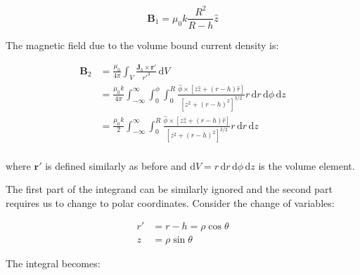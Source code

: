 \documentclass[12pt]{article}
\begin{document}
\begin{equation}
    \mathbf{B}_{1} = \mu_{0}k \frac{R^{2}}{R-h} \hat{z}
\end{equation}

The magnetic field due to the volume bound current density is:

\begin{equation}
    \begin{split}
        \mathbf{B}_{2} &= \frac{\mu_{0}}{4\pi} \int_{V} \frac{\mathbf{J}_{b} \times \mathbf{r}'}{r'^{3}} \, \mathrm{d}V \\
        &= \frac{\mu_{0}k}{4\pi} \int_{-\infty}^{\infty} \int_{0}^{\phi} \int_{0}^{R} \frac{\hat{\phi} \times [z \hat{z} + (r-h) \hat{r}]}{[z^{2} + (r-h)^{2}]^{3/2}} r \, \mathrm{d}r \, \mathrm{d}\phi \, \mathrm{d}z \\
        &= \frac{\mu_{0}k}{2} \int_{-\infty}^{\infty} \int_{0}^{R} \frac{\hat{\phi} \times [z \hat{z} + (r-h) \hat{r}]}{[z^{2} + (r-h)^{2}]^{3/2}} r \, \mathrm{d}r \, \mathrm{d}z \\
    \end{split}
\end{equation}

where $\mathbf{r}'$ is defined similarly as before and $\mathrm{d}V = r \, \mathrm{d}r \, \mathrm{d}\phi \, \mathrm{d}z$ is the volume element.

The first part of the integrand can be similarly ignored and the second part requires us to change to polar coordinates. Consider the change of variables:

\begin{equation}
    \begin{split}
        r' &= r - h = \rho \cos{\theta} \\
        z &= \rho \sin{\theta}
    \end{split}
\end{equation}

The integral becomes:
\end{document}
